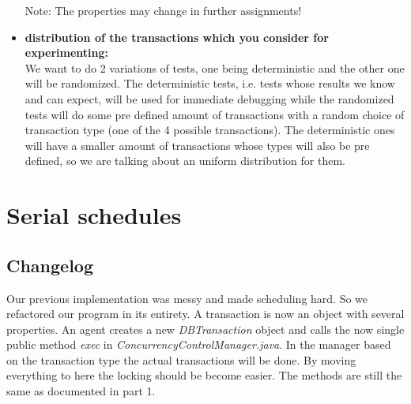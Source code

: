 \documentclass{vldb}
\begin{document}
\begin{itemize}
\begin{itemize}
\end{itemize}
Note: The properties may change in further assignments!
\item \textbf{distribution of the transactions which you consider for experimenting:} 
\\We want to do 2 variations of tests, one being deterministic and the other one will be randomized. The deterministic tests, i.e. tests whose results we know and can expect, will be used for immediate debugging while the randomized tests will do some pre defined amount of transactions with a random choice of transaction type (one of the 4 possible transactions). The deterministic ones will have a smaller amount of transactions whose types will also be pre defined, so we are talking about an uniform distribution for them.
\end{itemize}

\section{Serial schedules}
\subsection{Changelog}
Our previous implementation was messy and made scheduling hard. So we refactored our program in its entirety. A transaction is now an object with several properties. An agent creates a new \textit{DBTransaction} object and calls the now single public method \textit{exec} in \textit{ConcurrencyControlManager.java}. In the manager based on the transaction type the actual transactions will be done. By moving everything to here the locking should be become easier. The methods are still the same as documented in part 1.
\end{document}
